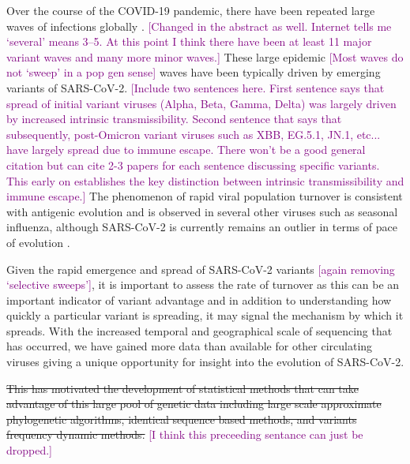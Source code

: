 \documentclass[12pt,oneside,letterpaper]{article}
\def\tbc#1{\textcolor{purple}{[#1]}}
\begin{document}


Over the course of the COVID-19 pandemic, there have been repeated large waves of infections globally  \cite{tegally2021detection, Volz2021}.
\tbc{Changed in the abstract as well. Internet tells me `several' means 3--5. At this point I think there have been at least 11 major variant waves and many more minor waves.}
These large epidemic \tbc{Most waves do not `sweep' in a pop gen sense} waves have been typically driven by emerging variants of SARS-CoV-2.
\tbc{Include two sentences here. First sentence says that spread of initial variant viruses (Alpha, Beta, Gamma, Delta) was largely driven by increased intrinsic transmissibility. Second sentence that says that subsequently, post-Omicron variant viruses such as XBB, EG.5.1, JN.1, etc... have largely spread due to immune escape. There won't be a good general citation but can cite 2-3 papers for each sentence discussing specific variants. This early on establishes the key distinction between intrinsic transmissibility and immune escape.}
The phenomenon of rapid viral population turnover is consistent with antigenic evolution and is observed in several other viruses such as seasonal influenza, although SARS-CoV-2 is currently remains an outlier in terms of pace of evolution \cite{Koel2013, Bedford2014, kistler2023atlas}.

Given the rapid emergence and spread of SARS-CoV-2 variants \tbc{again removing `selective sweeps'}, it is important to assess the rate of turnover as this can be an important indicator of variant advantage and in addition to understanding how quickly a particular variant is spreading, it may signal the mechanism by which it spreads.
With the increased temporal and geographical scale of sequencing that has occurred, we have gained more data than available for other circulating viruses giving a unique opportunity for insight into the evolution of SARS-CoV-2.

\sout{This has motivated the development of statistical methods that can take advantage of this large pool of genetic data including large scale approximate phylogenetic algorithms, identical sequence based methods, and variants frequency dynamic methods.}
\tbc{I think this preceeding sentance can just be dropped.}
\end{document}
